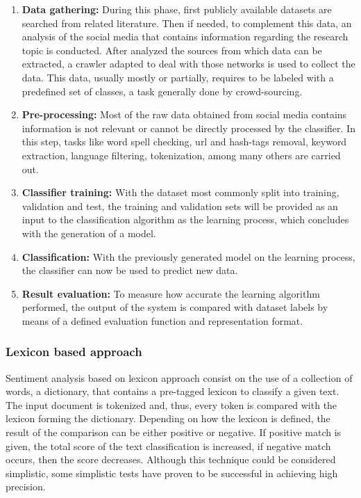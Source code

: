 \begin{enumerate}[label=\textbf{\arabic*}.]
  \item \textbf{Data gathering:} During this phase, first publicly available datasets are searched from related literature. Then if needed, to complement this data, an analysis of the social media that contains information regarding the research topic is conducted. After analyzed the sources from which data can be extracted, a crawler adapted to deal with those networks is used to collect the data. This data, usually mostly or partially, requires to be labeled with a predefined set of classes, a task generally done by crowd-sourcing.
  \item \textbf{Pre-processing:} Most of the raw data obtained from social media contains information is not relevant or cannot be directly processed by the classifier. In this step, tasks like word spell checking, \acrfull{url} and hash-tags removal, keyword extraction, language filtering, tokenization, among many others are carried out.
  \item \textbf{Classifier training:} With the dataset most commonly split into training, validation and test, the training and validation sets will be provided as an input to the classification algorithm as the learning process, which concludes with the generation of a model.
  \item \textbf{Classification:} With the previously generated model on the learning process, the classifier can now be used to predict new data.
  \item \textbf{Result evaluation:} To measure how accurate the learning algorithm performed, the output of the system is compared with dataset labels by means of a defined evaluation function and representation format.
\end{enumerate}

\subsubsection{Lexicon based approach}
\label{subsubsec:techniques_lexicon_based}

Sentiment analysis based on lexicon approach consist on the use of a collection of words, a dictionary, that contains a pre-tagged lexicon to classify a given text. The input document is tokenized and, thus, every token is compared with the lexicon forming the dictionary. Depending on how the lexicon is defined, the result of the comparison can be either positive or negative. If positive match is given, the total score of the text classification is increased, if negative match occurs, then the score decreases. Although this technique could be considered simplistic, some simplistic tests \cite{hatzivassiloglou2000effects} have proven to be successful in achieving high precision. 

